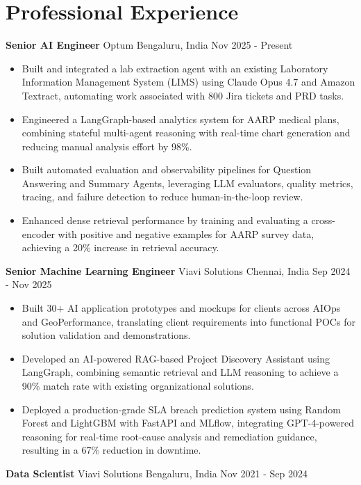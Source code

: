 \documentclass[10pt,a4paper]{article}
\newcommand{\role}[4]{\textbf{#1} \textbar{} #2 \hfill #3 \textbar{} #4\par}
\begin{document}
\section{Professional Experience}
\role{Senior AI Engineer}{Optum}{Bengaluru, India}{Nov 2025 - Present}
\begin{itemize}
  \item Built and integrated a lab extraction agent with an existing Laboratory Information Management System (LIMS) using Claude Opus 4.7 and Amazon Textract, automating work associated with 800 Jira tickets and PRD tasks.
  \item Engineered a LangGraph-based analytics system for AARP medical plans, combining stateful multi-agent reasoning with real-time chart generation and reducing manual analysis effort by 98\%.
  \item Built automated evaluation and observability pipelines for Question Answering and Summary Agents, leveraging LLM evaluators, quality metrics, tracing, and failure detection to reduce human-in-the-loop review.
  \item Enhanced dense retrieval performance by training and evaluating a cross-encoder with positive and negative examples for AARP survey data, achieving a 20\% increase in retrieval accuracy.
\end{itemize}
\vspace{3pt}
\role{Senior Machine Learning Engineer}{Viavi Solutions}{Chennai, India}{Sep 2024 - Nov 2025}
\begin{itemize}
  \item Built 30+ AI application prototypes and mockups for clients across AIOps and GeoPerformance, translating client requirements into functional POCs for solution validation and demonstrations.
  \item Developed an AI-powered RAG-based Project Discovery Assistant using LangGraph, combining semantic retrieval and LLM reasoning to achieve a 90\% match rate with existing organizational solutions.
  \item Deployed a production-grade SLA breach prediction system using Random Forest and LightGBM with FastAPI and MLflow, integrating GPT-4-powered reasoning for real-time root-cause analysis and remediation guidance, resulting in a 67\% reduction in downtime.
\end{itemize}
\vspace{3pt}
\role{Data Scientist}{Viavi Solutions}{Bengaluru, India}{Nov 2021 - Sep 2024}
\end{document}
